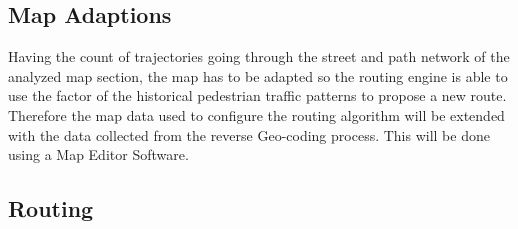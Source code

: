 \subsection{Map Adaptions}

Having the count of trajectories going through the street and path network of the analyzed map section, the map has to be adapted so the routing engine is able to use the factor of the historical pedestrian traffic patterns to propose a new route. Therefore the map data used to configure the routing algorithm will be extended with the data collected from the reverse Geo-coding process. This will be done using a Map Editor Software.

\subsection{Routing}





%
%
%



